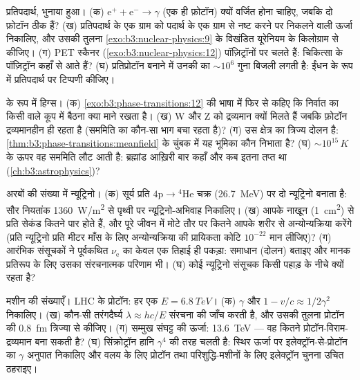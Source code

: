 \begin{exercise}[$\star\star$]\label{exo:b3:particle-physics:8}
प्रतिपदार्थ, भुनाया हुआ। (क)
$\text{e}^+ + \text{e}^- \to \gamma$ (एक ही फ़ोटॉन) क्यों वर्जित
होना चाहिए, जबकि दो फ़ोटॉन ठीक हैं? (ख) प्रतिपदार्थ के एक ग्राम को
पदार्थ के एक ग्राम से नष्ट करने पर निकलने वाली ऊर्जा निकालिए, और उसकी
तुलना \cref{exo:b3:nuclear-physics:9} के विखंडित यूरेनियम के
किलोग्राम से कीजिए। (ग) PET स्कैनर
(\cref{exo:b3:nuclear-physics:12}) पॉज़िट्रॉनों पर चलते हैं:
चिकित्सा के पॉज़िट्रॉन कहाँ से आते हैं? (घ) प्रतिप्रोटॉन बनाने में
उनकी  का $\sim10^{6}$ गुना बिजली लगती है: ईंधन के रूप में
प्रतिपदार्थ पर टिप्पणी कीजिए।
\end{exercise}

\begin{exercise}[$\star\star\star$]\label{exo:b3:particle-physics:9}
 के रूप में हिग्स। (क)
\cref{exo:b3:phase-transitions:12} की भाषा में फिर से कहिए कि
निर्वात का किसी  वाले कूप में बैठना क्या माने रखता है। (ख) W और Z
को द्रव्यमान क्यों मिलते हैं जबकि फ़ोटॉन द्रव्यमानहीन ही रहता है
(सममिति का कौन-सा भाग बचा रहता है)? (ग)  उस क्षेत्र का
त्रिज्य दोलन है: \cref{thm:b3:phase-transitions:meanfield} के चुंबक
में यह भूमिका कौन निभाता है? (घ)
$\sim10^{15}\,\unit{K}$ के ऊपर वह सममिति लौट आती है: ब्रह्मांड आख़िरी
बार कहाँ और कब इतना तप्त था (\cref{ch:b3:astrophysics})?
\end{exercise}

\begin{exercise}[$\star\star\star$]\label{exo:b3:particle-physics:10}
अरबों की संख्या में न्यूट्रिनो। (क) सूर्य प्रति
$4\text{p} \to {}^4\text{He}$ चक्र (\qty{26.7}{MeV}) पर दो
न्यूट्रिनो बनाता है: सौर नियतांक \qty{1360}{W/m^2} से पृथ्वी पर
न्यूट्रिनो-अभिवाह निकालिए। (ख) आपके नाखून
(\qty{1}{cm^2}) से प्रति सेकंड कितने पार होते हैं, और पूरे जीवन में
मोटे तौर पर कितने आपके शरीर से अन्योन्यक्रिया करेंगे (प्रति
न्यूट्रिनो प्रति मीटर माँस के लिए अन्योन्यक्रिया की प्रायिकता
कोटि $10^{-22}$ मान लीजिए)? (ग) आरंभिक
संसूचकों ने पूर्वकथित $\nu_{\text{e}}$ का केवल एक तिहाई ही पकड़ा:
समाधान (दोलन) बताइए और मानक प्रतिरूप के लिए उसका
संरचनात्मक परिणाम भी। (घ) कोई न्यूट्रिनो संसूचक किसी पहाड़ के नीचे
क्यों रहता है?
\end{exercise}

\begin{exercise}[$\star\star\star$]\label{exo:b3:particle-physics:11}
मशीन की संख्याएँ। LHC के प्रोटॉन: हर एक $E = \qty{6.8}{TeV}$। (क)
$\gamma$ और $1 - v/c \approx 1/2\gamma^2$ निकालिए। (ख) कौन-सी
तरंगदैर्घ्य $\lambda \approx hc/E$ संरचना की जाँच करती है, और उसकी
तुलना प्रोटॉन की \qty{0.8}{fm} त्रिज्या से कीजिए। (ग) सम्मुख संघट्ट
की ऊर्जा: \qty{13.6}{TeV} --- वह कितने प्रोटॉन-विराम-द्रव्यमान
बना सकती है? (घ) सिंक्रोट्रॉन हानि $\gamma^4$ की तरह चलती है:
स्थिर ऊर्जा पर इलेक्ट्रॉन-से-प्रोटॉन का $\gamma$ अनुपात
निकालिए और वलय के लिए प्रोटॉन तथा परिशुद्धि-मशीनों के लिए
इलेक्ट्रॉन चुनना उचित ठहराइए।
\end{exercise}

